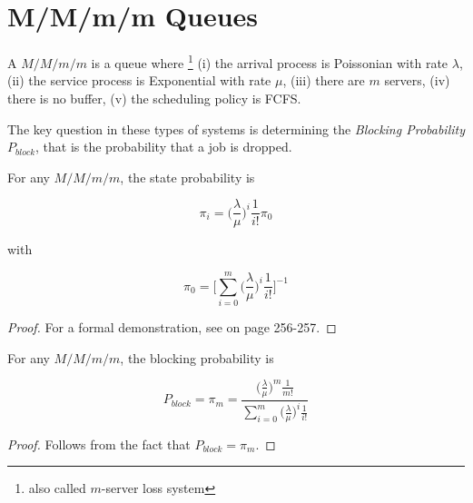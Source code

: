 \section{M/M/m/m Queues}
\label{sec:M-M-m-m-Queues}

A $M/M/m/m$ is a queue where \footnote{also called $m$-server loss system}
(i) the arrival process is Poissonian with rate $\lambda$,
(ii) the service process is Exponential with rate $\mu$,
(iii) there are $m$ servers,
(iv) there is no buffer,
(v) the scheduling policy is FCFS.

  
The key question in these types of systems is determining the \textit{Blocking Probability} $P_{block}$, that is the probability that a job is dropped.

\begin{theorem}
\label{thm:M-M-m-m-Probability-State}

	For any $M/M/m/m$, the state probability is

	\begin{equation}
	\label{eqn:M-M-m-m-Probability-State}
	\pi_{i} = \Big( \frac{\lambda}{\mu} \Big)^{i} \frac{1}{i!} \pi_{0} 
	\end{equation}
	
	with
	
	\begin{equation}
	\label{eqn:M-M-m-m-Queue-Probability-State-Zero}
	\pi_{0} = \Big[ \sum_{i=0}^{m} \Big( \frac{\lambda}{\mu} \Big)^{i} \frac{1}{i!} \Big]^{-1}
	\end{equation}
	
	\begin{proof}
		For a formal demonstration, see \cite{harchol2013performance} on page 256-257.
	\end{proof}
\end{theorem}

\begin{theorem}
\label{thm:M-M-m-m-Probability-Block}	
	For any $M/M/m/m$, the blocking probability is
	
	\begin{equation}
	\label{eqn:M-M-m-m-Probability-Block}
		P_{block} = \pi_{m} = \frac{\Big(\frac{\lambda}{\mu}\Big)^{m} \frac{1}{m!}}{\sum_{i=0}^{m} \Big( \frac{\lambda}{\mu} \Big)^{i} \frac{1}{i!}}
	\end{equation}
	
	\begin{proof}
		Follows from the fact that $P_{block} = \pi_{m}$. 
	\end{proof}
\end{theorem}

